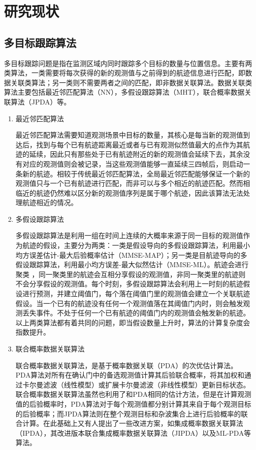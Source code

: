 \section{研究现状}

\subsection{多目标跟踪算法}
多目标跟踪问题是指在监测区域内同时跟踪多个目标的数量与位置信息。主要有两类算法，一类需要将每次获得的新的观测值与之前得到的航迹信息进行匹配，即数据关联类算法；另一类则不需要两者之间的匹配，即非数据关联算法。数据关联类算法主要包括最近邻匹配算法\cite{singer1971optimal}（NN），多假设跟踪算法\cite{blackman2004multiple}（MHT），联合概率数据关联算法\cite{fortmann1983sonar}（JPDA）等。

\begin{enumerate}

\item{最近邻匹配算法}

最近邻匹配算法需要知道观测场景中目标的数量，其核心是每当新的观测值到达后，找到与每个已有航迹距离最近或者与已有观测似然值最大的点作为其航迹的延续，因此只有那些处于已有航迹附近的新的观测值会延续下去，其余没有对应的观测值则会被记录，当这些观测值能够一直延续三四帧后，则启动一条新的航迹。相较于传统最近邻匹配算法，全局最近邻匹配\cite{sinha2012track}能够保证一个新的观测值只与一个已有航迹进行匹配，而非可以与多个相近的航迹匹配。然而相临近的航迹仍然难以区分新的观测值序列是属于哪个航迹，因此该算法无法处理航迹相近的情况。

\item{多假设跟踪算法}

多假设跟踪算法是利用一组在时间上连续的大概率来源于同一目标的观测值作为航迹的假设，主要分为两类：一类是假设导向的多假设跟踪算法\cite{reid1979algorithm}，利用最小均方误差估计-最大后验概率估计（MMSE-MAP）；另一类是目航迹导向的多假设跟踪算法\cite{blackman1999design}，利用最小均方误差-最大似然估计（MMSE-ML）。航迹会进行聚类 ，同一聚类里的航迹会互相分享假设的观测值，非同一聚类里的航迹则不会分享假设的观测值。每个时刻，多假设跟踪算法会利用上一时刻的航迹假设进行预测，并建立阈值门，每个落在阈值门里的观测值会建立一个关联航迹假设。当一个已有的航迹没有任何一个观测值落在其阈值门内时，则会触发观测丢失事件。不处于任何一个已有航迹的阈值门内的观测值会触发新的航迹。以上两类算法都有着共同的问题，即当假设数量上升时，算法的计算复杂度会指数提升。

\item{联合概率数据关联算法}

联合概率数据关联算法，是基于概率数据关联（PDA）\cite{bar1975tracking}的次优估计算法。PDA算法对所有在确认门中的备选观测值计算其后验联合概率，将其加权和通过卡尔曼滤波（线性模型）或扩展卡尔曼滤波（非线性模型）更新目标状态。联合概率数据关联算法虽然也利用了和PDA相同的估计方法，但是在计算观测值的后验概率时，PDA算法对于每个观测值都分别计算其来自于每个观测目标的后验概率；而JPDA算法则在整个观测目标和杂波集合上进行后验概率的联合计算。在此基础上又有人提出了一些改进方案，如集成概率数据关联算法（IPDA）\cite{musicki1994integrated}，其改进版本联合集成概率数据关联算法（JIPDA）\cite{musicki2004joint}以及ML-PDA\cite{kirubarajan1995low,jauffret1990track}等算法。
\end{enumerate}

